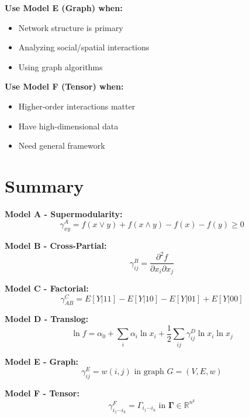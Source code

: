 \begin{tcolorbox}[colback=yellow!5!white,colframe=yellow!75!black,title=\textbf{Model Selection Guide}]
\textbf{Use Model E (Graph) when:}
\begin{itemize}[noitemsep]
    \item Network structure is primary
    \item Analyzing social/spatial interactions
    \item Using graph algorithms
\end{itemize}

\textbf{Use Model F (Tensor) when:}
\begin{itemize}[noitemsep]
    \item Higher-order interactions matter
    \item Have high-dimensional data
    \item Need general framework
\end{itemize}

\end{tcolorbox}

\section{Summary}
\label{sec:summary}

\begin{tcolorbox}[colback=gray!5!white,colframe=gray!75!black,title=\textbf{Summary: Six Models of Complementarity}]

\textbf{Model A - Supermodularity:}
\begin{equation}
\gamma^A_{xy} = f(x \vee y) + f(x \wedge y) - f(x) - f(y) \geq 0
\end{equation}

\textbf{Model B - Cross-Partial:}
\begin{equation}
\gamma^B_{ij} = \frac{\partial^2 f}{\partial x_i \partial x_j}
\end{equation}

\textbf{Model C - Factorial:}
\begin{equation}
\gamma^C_{AB} = E[Y|11] - E[Y|10] - E[Y|01] + E[Y|00]
\end{equation}

\textbf{Model D - Translog:}
\begin{equation}
\ln f = \alpha_0 + \sum_i \alpha_i \ln x_i + \frac{1}{2} \sum_{ij} \gamma^D_{ij} \ln x_i \ln x_j
\end{equation}

\textbf{Model E - Graph:}
\begin{equation}
\gamma^E_{ij} = w(i, j) \text{ in graph } G = (V, E, w)
\end{equation}

\textbf{Model F - Tensor:}
\begin{equation}
\gamma^F_{i_1 \cdots i_k} = \Gamma_{i_1 \cdots i_k} \text{ in } \boldsymbol{\Gamma} \in \mathbb{R}^{n^k}
\end{equation}

\end{tcolorbox}

